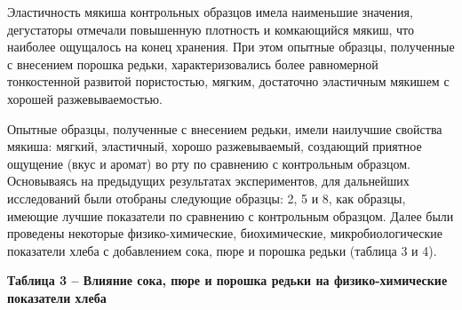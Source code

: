 Эластичность мякиша контрольных образцов имела наименьшие значения,
дегустаторы отмечали повышенную плотность и комкающийся мякиш, что
наиболее ощущалось на конец хранения. При этом опытные образцы,
полученные с внесением порошка редьки, характеризовались более
равномерной тонкостенной развитой пористостью, мягким, достаточно
эластичным мякишем с хорошей разжевываемостью.

Опытные образцы, полученные с внесением редьки, имели наилучшие свойства
мякиша: мягкий, эластичный, хорошо разжевываемый, создающий приятное
ощущение (вкус и аромат) во рту по сравнению с контрольным образцом.
Основываясь на предыдущих результатах экспериментов, для дальнейших
исследований были отобраны следующие образцы: 2, 5 и 8, как образцы,
имеющие лучшие показатели по сравнению с контрольным образцом. Далее
были проведены некоторые физико-химические, биохимические,
микробиологические показатели хлеба с добавлением сока, пюре и порошка
редьки (таблица 3 и 4).

{\bfseries Таблица 3 -- Влияние сока, пюре и порошка редьки на
физико-химические показатели хлеба}


